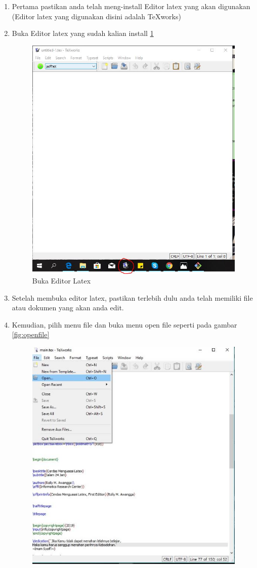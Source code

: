 \begin{enumerate}
\item Pertama pastikan anda telah meng-install Editor latex yang akan digunakan (Editor latex yang digunakan disini adalah TeXworks)
\item Buka Editor latex yang sudah kalian install \ref{fig:openeditor}
  \begin{figure}[!htbp]
  \centering
  \includegraphics[width=.75\textwidth]{figures/openeditor.JPG}
  \caption{Buka Editor Latex}\label{fig:openeditor}
\end{figure}
\item Setelah membuka editor latex, pastikan terlebih dulu anda telah memiliki file atau dokumen yang akan anda edit. 
\item Kemudian, pilih menu file dan buka menu open file seperti pada gambar \ref{fig:openfile}
  \begin{figure}[!htbp]
  \centering
  \includegraphics[width=.75\textwidth]{figures/openfile.JPG}

\end{figure}
\end{enumerate}
